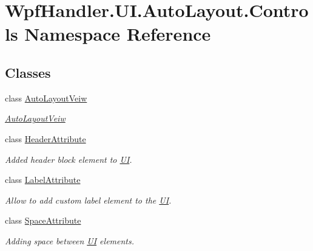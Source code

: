 \hypertarget{namespace_wpf_handler_1_1_u_i_1_1_auto_layout_1_1_controls}{}\section{Wpf\+Handler.\+U\+I.\+Auto\+Layout.\+Controls Namespace Reference}
\label{namespace_wpf_handler_1_1_u_i_1_1_auto_layout_1_1_controls}
\subsection*{Classes}
\begin{DoxyCompactItemize}
\item 
class \mbox{\hyperlink{class_wpf_handler_1_1_u_i_1_1_auto_layout_1_1_controls_1_1_auto_layout_veiw}{Auto\+Layout\+Veiw}}
\begin{DoxyCompactList}\small\item\em \mbox{\hyperlink{class_wpf_handler_1_1_u_i_1_1_auto_layout_1_1_controls_1_1_auto_layout_veiw}{Auto\+Layout\+Veiw}} \end{DoxyCompactList}\item 
class \mbox{\hyperlink{class_wpf_handler_1_1_u_i_1_1_auto_layout_1_1_controls_1_1_header_attribute}{Header\+Attribute}}
\begin{DoxyCompactList}\small\item\em Added header block element to \mbox{\hyperlink{namespace_wpf_handler_1_1_u_i}{UI}}. \end{DoxyCompactList}\item 
class \mbox{\hyperlink{class_wpf_handler_1_1_u_i_1_1_auto_layout_1_1_controls_1_1_label_attribute}{Label\+Attribute}}
\begin{DoxyCompactList}\small\item\em Allow to add custom label element to the \mbox{\hyperlink{namespace_wpf_handler_1_1_u_i}{UI}}. \end{DoxyCompactList}\item 
class \mbox{\hyperlink{class_wpf_handler_1_1_u_i_1_1_auto_layout_1_1_controls_1_1_space_attribute}{Space\+Attribute}}
\begin{DoxyCompactList}\small\item\em Adding space between \mbox{\hyperlink{namespace_wpf_handler_1_1_u_i}{UI}} elements. \end{DoxyCompactList}\end{DoxyCompactItemize}
